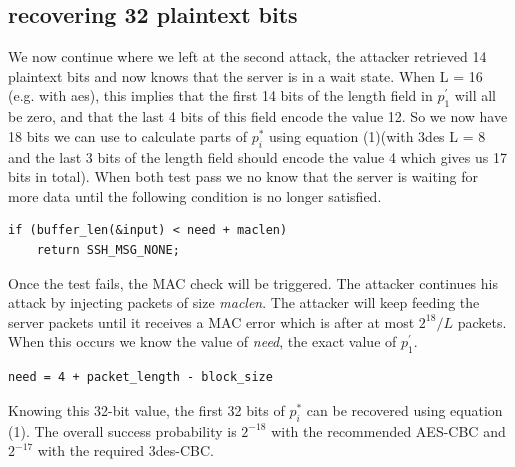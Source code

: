 \documentclass[twocolumn]{article}
\begin{document}
\subsection{recovering 32 plaintext bits}
We now continue where we left at the second attack, the attacker retrieved 14 plaintext bits and now knows that the server is in a wait state. When L = 16 (e.g. with aes), this implies that the first 14 bits of the length field in $p^{'}_1$ will all be zero, and that the last 4 bits of this field encode the value 12. So we now have 18 bits we can use to calculate parts of $p^*_i$ using equation (1)(with 3des L = 8 and the last 3 bits of the length field should encode the value 4 which gives us 17 bits in total). When both test pass we no know that the server is waiting for more data until the following condition is no longer satisfied.
\begin{verbatim}
if (buffer_len(&input) < need + maclen)
	return SSH_MSG_NONE;
\end{verbatim}
Once the test fails, the MAC check will be triggered. The attacker continues his attack by injecting packets of size \emph{maclen}. The attacker will keep feeding the server packets until it receives a MAC error which is after at most $2^{18}/L$ packets. When this occurs we know the value of \emph{need}, the exact value of $p_1^{'}$.
\begin{verbatim}
need = 4 + packet_length - block_size
\end{verbatim}
Knowing this 32-bit value, the first 32 bits of $p^*_i$ can be recovered using equation (1).
The overall success probability is $2^{-18}$ with the recommended AES-CBC and $2^{-17}$ with the required 3des-CBC.


\end{document}
